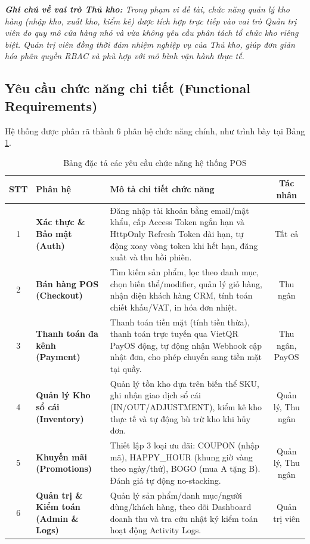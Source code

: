 \textit{\textbf{Ghi chú về vai trò Thủ kho:} Trong phạm vi đề tài, chức năng quản lý kho hàng (nhập kho, xuất kho, kiểm kê) được tích hợp trực tiếp vào vai trò Quản trị viên do quy mô cửa hàng nhỏ và vừa không yêu cầu phân tách tổ chức kho riêng biệt. Quản trị viên đồng thời đảm nhiệm nghiệp vụ của Thủ kho, giúp đơn giản hóa phân quyền RBAC và phù hợp với mô hình vận hành thực tế.}

\subsection{Yêu cầu chức năng chi tiết (Functional Requirements)}
Hệ thống được phân rã thành 6 phân hệ chức năng chính, như trình bày tại Bảng \ref{tab:yeu_cau_chuc_nang}.

\begin{table}[htbp]
\centering
\caption{Bảng đặc tả các yêu cầu chức năng hệ thống POS}
\label{tab:yeu_cau_chuc_nang}
\vspace{2mm}
\begin{tabularx}{\textwidth}{|c|p{3.5cm}|X|c|}
\hline
\textbf{STT} & \textbf{Phân hệ} & \textbf{Mô tả chi tiết chức năng} & \textbf{Tác nhân} \\ \hline
1 & \textbf{Xác thực \& Bảo mật (Auth)} & Đăng nhập tài khoản bằng email/mật khẩu, cấp Access Token ngắn hạn và HttpOnly Refresh Token dài hạn, tự động xoay vòng token khi hết hạn, đăng xuất và thu hồi phiên. & Tất cả \\ \hline
2 & \textbf{Bán hàng POS (Checkout)} & Tìm kiếm sản phẩm, lọc theo danh mục, chọn biến thể/modifier, quản lý giỏ hàng, nhận diện khách hàng CRM, tính toán chiết khấu/VAT, in hóa đơn nhiệt. & Thu ngân \\ \hline
3 & \textbf{Thanh toán đa kênh (Payment)} & Thanh toán tiền mặt (tính tiền thừa), thanh toán trực tuyến qua VietQR PayOS động, tự động nhận Webhook cập nhật đơn, cho phép chuyển sang tiền mặt tại quầy. & Thu ngân, PayOS \\ \hline
4 & \textbf{Quản lý Kho sổ cái (Inventory)} & Quản lý tồn kho dựa trên biến thể SKU, ghi nhận giao dịch sổ cái (IN/OUT/ADJUSTMENT), kiểm kê kho thực tế và tự động bù trừ kho khi hủy đơn. & Quản lý, Thu ngân \\ \hline
5 & \textbf{Khuyến mãi (Promotions)} & Thiết lập 3 loại ưu đãi: COUPON (nhập mã), HAPPY\_HOUR (khung giờ vàng theo ngày/thứ), BOGO (mua A tặng B). Đánh giá tự động no-stacking. & Quản lý, Thu ngân \\ \hline
6 & \textbf{Quản trị \& Kiểm toán (Admin \& Logs)} & Quản lý sản phẩm/danh mục/người dùng/khách hàng, theo dõi Dashboard doanh thu và tra cứu nhật ký kiểm toán hoạt động Activity Logs. & Quản trị viên \\ \hline
\end{tabularx}
\end{table}

